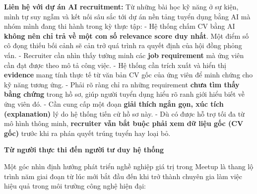 \textbf{Liên hệ với dự án AI recruitment:} Từ những bài học kỹ năng ở sự
kiện, mình tự suy ngẫm và kết nối sâu sắc tới dự án nền tảng tuyển dụng
bằng AI mà nhóm mình đang thi hành trong kỳ thực tập: - Hệ thống chấm CV
bằng AI \textbf{không nên chỉ trả về một con số relevance score duy
nhất}. Một điểm số cô đọng thiếu bối cảnh sẽ cản trở quá trình ra quyết
định của hội đồng phỏng vấn. - Recruiter cần nhìn thấy tường minh các
\textbf{job requirement} mà ứng viên cần đạt được theo mô tả công việc.
- Hệ thống cần trích xuất và hiển thị \textbf{evidence} mang tính thực
tế từ văn bản CV gốc của ứng viên để minh chứng cho kỹ năng tương ứng. -
Phải rõ ràng chỉ ra những requirement \textbf{chưa tìm thấy bằng chứng}
trong hồ sơ, giúp người tuyển dụng hiểu rõ ranh giới hiểu biết về ứng
viên đó. - Cần cung cấp một đoạn \textbf{giải thích ngắn gọn, xúc tích
(explanation)} lý do hệ thống tiến cử hồ sơ này. - Dù có được hỗ trợ tối
đa từ mô hình thông minh, \textbf{recruiter vẫn bắt buộc phải xem dữ
liệu gốc (CV gốc)} trước khi ra phán quyết trúng tuyển hay loại bỏ.

\vspace{0.5em}\noindent\textbf{Từ người thực thi đến người tư duy hệ
thống}\par

Một góc nhìn định hướng phát triển nghề nghiệp giá trị trong Meetup là
thang lộ trình năm giai đoạn từ lúc mới bắt đầu đến khi trở thành chuyên
gia làm việc hiệu quả trong môi trường công nghệ hiện đại:

